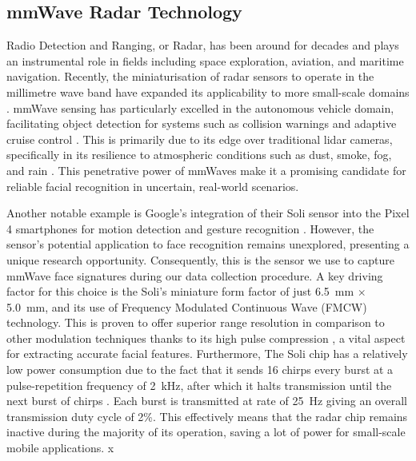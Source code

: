 \documentclass{mpaper}
\begin{document}
\subsection{mmWave Radar Technology}
Radio Detection and Ranging, or Radar, has been around for decades and plays an instrumental role in fields including space exploration, aviation, and maritime navigation. Recently, the miniaturisation of radar sensors to operate in the millimetre wave band have expanded its applicability to more small-scale domains \cite{soumya2023recent}. mmWave sensing has particularly excelled in the autonomous vehicle domain, facilitating object detection for systems such as collision warnings and adaptive cruise control \cite{dfrobot}. This is primarily due to its edge over traditional lidar cameras, specifically in its resilience to atmospheric conditions such as dust, smoke, fog, and rain \cite{cadenceblog2022}. This penetrative power of mmWaves make it a promising candidate for reliable facial recognition in uncertain, real-world scenarios. 

Another notable example is Google's integration of their Soli sensor into the Pixel 4 smartphones for motion detection and gesture recognition \cite{googleblog2020}. However, the sensor's potential application to face recognition remains unexplored, presenting a unique research opportunity. Consequently, this is the sensor we use to capture mmWave face signatures during our data collection procedure. A key driving factor for this choice is the Soli's miniature form factor of just \qty{6.5}{\mm} $\times$ \qty{5.0}{\mm}, and its use of Frequency Modulated Continuous Wave (FMCW) technology. This is proven to offer superior range resolution in comparison to other modulation techniques thanks to its high pulse compression \cite{mahafza2005radar}, a vital aspect for extracting accurate facial features. Furthermore, The Soli chip has a relatively low power consumption due to the fact that it sends 16 chirps every burst at a pulse-repetition frequency of \qty{2}{\kHz}, after which it halts transmission until the next burst of chirps \cite{hayashi2021radarnet, mitchell2023mmsense}. Each burst is transmitted at rate of \qty{25}{\Hz} giving an overall transmission duty cycle of 2\%. This effectively means that the radar chip remains inactive during the majority of its operation, saving a lot of power for small-scale mobile applications.
x
\vspace{0.05cm}
\end{document}
